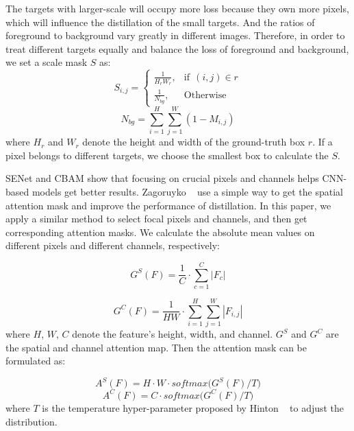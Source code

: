 \documentclass[10pt,twocolumn,letterpaper]{article}
\begin{document}
The targets with larger-scale will occupy more loss because they own more pixels, which will influence the distillation of the small targets. And the ratios of foreground to background vary greatly in different images. Therefore, in order to treat different targets equally and balance the loss of foreground and background, we set a scale mask $S$ as:
\begin{equation}
    \label{s-mask}
    S_{i,j}=
    \begin{cases}
        \frac{1}{H_{r}W_{r}}, & \text{if}\ \ (i,j)\in r \\ 
        \frac{1}{N_{bg}}, & \text{Otherwise}
    \end{cases}
\end{equation}
\begin{equation}
    \label{Nbg}
    N_{bg}=\sum_{i=1}^{H}\sum_{j=1}^{W}(1- M_{i,j})
\end{equation}
where $H_{r}$ and $W_{r}$ denote the height and width of the ground-truth box $r$. If a pixel belongs to different targets, we choose the smallest box to calculate the $S$.

SENet\cite{hu2018squeeze} and CBAM\cite{woo2018cbam} show that focusing on crucial pixels and channels helps CNN-based models get better results. Zagoruyko \etal~\cite{zagoruyko2016paying} use a simple way to get the spatial attention mask and improve the performance of distillation. In this paper, we apply a similar method to select focal pixels and channels, and then get corresponding attention masks. We calculate the absolute mean values on different pixels and different channels, respectively:

\begin{equation}
    \label{ms-a}
    G^{S}(F)=\frac{1}{C}\cdot\sum_{c=1}^{C}\left | F_{c}\right |
\end{equation}

\begin{equation}
    \label{mc-a}
    G^{C}(F)=\frac{1}{HW}\cdot\sum_{i=1}^{H}\sum_{j=1}^{W}|F_{i,j}|
\end{equation}
where $H$, $W$, $C$ denote the feature's height, width, and channel. $G^{S}$ and $G^{C}$ are the spatial and channel attention map. Then the attention mask can be formulated as:

\begin{equation}
    \label{s-a}
    A^{S}(F)=H\cdot W\cdot softmax\big(G^{S}(F)/T\big)
\end{equation}
\begin{equation}
    \label{c-a}
    A^{C}(F)=C\cdot softmax\big(G^{C}(F)/T\big)
\end{equation}
where $T$ is the temperature hyper-parameter proposed by Hinton \etal~\cite{hinton2015distilling} to adjust the distribution.
\end{document}
